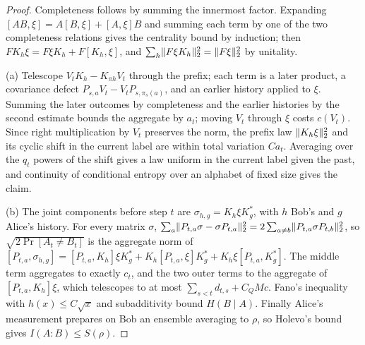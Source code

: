 \begin{proof}
Completeness follows by summing the innermost factor. Expanding $[AB,\xi]=A[B,\xi]+[A,\xi]B$ and summing each term by one of
the two completeness relations gives the centrality bound by induction; then $FK_h\xi=F\xi K_h+F[K_h,\xi]$, and
$\sum_h\lVert F\xi K_h\rVert_2^2=\lVert F\xi\rVert_2^2$ by unitality.

(a) Telescope $V_tK_h-K_{\pi h}V_t$ through the prefix; each term is a later product, a covariance defect
$P_{s,a}V_t-V_tP_{s,\pi_s(a)}$, and an earlier history applied to $\xi$. Summing the later outcomes by completeness and the earlier
histories by the second estimate bounds the aggregate by $a_t$; moving $V_t$ through $\xi$ costs $c(V_t)$. Since right
multiplication by $V_t$ preserves the norm, the prefix law $\lVert K_h\xi\rVert_2^2$ and its cyclic shift in the current label are within
total variation $Ca_t$. Averaging over the $q_t$ powers of the shift gives a law uniform in the current label given the past,
and continuity of conditional entropy over an alphabet of fixed size gives the claim.

(b) The joint components before step $t$ are $\sigma_{h,g}=K_h\xi K_g^*$, with $h$ Bob's and $g$ Alice's history. For every
matrix $\sigma$, $\sum_a\lVert P_{t,a}\sigma-\sigma P_{t,a}\rVert_2^2=2\sum_{a\ne b}\lVert P_{t,a}\sigma P_{t,b}\rVert_2^2$, so $\sqrt{2\Pr[A_t\ne B_t]}$ is the
aggregate norm of $[P_{t,a},\sigma_{h,g}]=[P_{t,a},K_h]\xi K_g^*+K_h[P_{t,a},\xi]K_g^*+K_h\xi[P_{t,a},K_g^*]$. The middle term
aggregates to exactly $c_t$, and the two outer terms to the aggregate of $[P_{t,a},K_h]\xi$, which telescopes to at most
$\sum_{s<t}d_{t,s}+C_QMc$. Fano's inequality with $h(x)\le C\sqrt x$ and subadditivity bound $H(B\mid A)$. Finally Alice's
measurement prepares on Bob an ensemble averaging to $\rho$, so Holevo's bound gives $I(A:B)\le S(\rho)$.
\end{proof}

